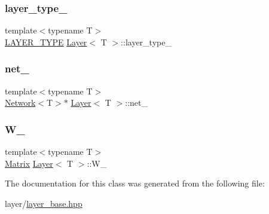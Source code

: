 \mbox{\label{class_layer_af60ad69b5833427d6a6a4d49db902d76}} 
\subsubsection{\texorpdfstring{layer\_type\_}{layer\_type\_}}
{\footnotesize\ttfamily template$<$typename T$>$ \\
\mbox{\hyperlink{layer__base_8hpp_a5f7e99058765b058df158c099200b154}{L\+A\+Y\+E\+R\+\_\+\+T\+Y\+PE}} \mbox{\hyperlink{class_layer}{Layer}}$<$ T $>$\+::layer\+\_\+type\+\_\+\hspace{0.3cm}{\ttfamily [protected]}}

\mbox{\label{class_layer_a5c55f43a191e4fed38002316ca71b4ff}} 
\subsubsection{\texorpdfstring{net\_}{net\_}}
{\footnotesize\ttfamily template$<$typename T$>$ \\
\mbox{\hyperlink{class_network}{Network}}$<$T$>$$\ast$ \mbox{\hyperlink{class_layer}{Layer}}$<$ T $>$\+::net\+\_\+\hspace{0.3cm}{\ttfamily [protected]}}

\mbox{\label{class_layer_a1dd882f1ce286b7d36aa4d14c815b2d3}} 
\subsubsection{\texorpdfstring{W\_}{W\_}}
{\footnotesize\ttfamily template$<$typename T$>$ \\
\mbox{\hyperlink{class_layer_a22b1e7286096aa62bd245536c8ebdaf1}{Matrix}} \mbox{\hyperlink{class_layer}{Layer}}$<$ T $>$\+::W\+\_\+\hspace{0.3cm}{\ttfamily [protected]}}



The documentation for this class was generated from the following file\+:\begin{DoxyCompactItemize}
\item 
layer/\mbox{\hyperlink{layer__base_8hpp}{layer\+\_\+base.\+hpp}}\end{DoxyCompactItemize}
